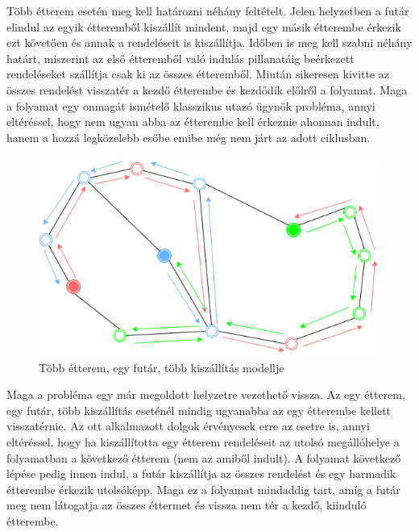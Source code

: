 

Több étterem esetén meg kell határozni néhány feltételt. Jelen helyzetben a futár elindul az egyik étteremből kiszállít mindent, majd egy másik étterembe érkezik ezt követően és annak a rendeléseit is kiszállítja. Időben is meg kell szabni néhány határt, miszerint az első étteremből való indulás pillanatáig beérkezett rendeléseket szállítja csak ki az összes étteremből. Miután sikeresen kivitte az összes rendelést visszatér a kezdő étterembe és kezdődik előlről a folyamat. Maga a folyamat egy onmagát ismételő klasszikus utazó ügynök probléma, annyi eltéréssel, hogy nem ugyan abba az étterembe kell érkeznie ahonnan indult, hanem a hozzá legközelebb esőbe emibe még nem járt az adott ciklusban.

\begin{figure}[h!]
\centering
\includegraphics[scale=0.6]{images/Circulartsp.png}
\caption{Több étterem, egy futár, több kiszállítás modellje}
\label{fig:model3}
\end{figure}



Maga a probléma egy már megoldott helyzetre vezethető vissza. Az egy étterem, egy futár, több kiszállítás eseténél mindig ugyanabba az egy étterembe kellett visszatérnie. Az ott alkalmazott dolgok érvényesek erre az esetre is, annyi eltéréssel, hogy ha kiszállította egy étterem rendeléseit az utolsó megállóhelye a folyamatban a következő étterem (nem az amiből indult). A folyamat következő lépése pedig innen indul, a futár kiszállítja az összes rendelést és egy harmadik étterembe érkezik utolsóképp. Maga ez a folyamat mindaddig tart, amíg a futár meg nem látogatja az összes éttermet és vissza nem tér a kezdő, kiinduló étterembe. 

